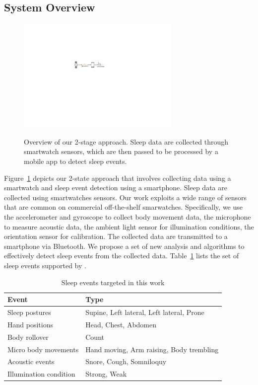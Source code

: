 \subsection{System Overview}

\begin{figure}
  \centering
  \includegraphics[width=0.7\textwidth]{figures/overviewd.pdf}\\
  \caption{Overview of our 2-stage approach. Sleep data are collected through smartwatch sensors, which are then passed to be processed by a mobile app
  to detect sleep events.}\label{fig:overview}
\end{figure}

Figure~\ref {fig:overview} depicts our 2-state approach that involves collecting data using a smartwatch and sleep event detection using a
smartphone. Sleep data are collected using smartwatches sensors. Our work exploits a wide range of sensors that are common on commercial
off-the-shelf smarwatches. Specifically, we use the accelerometer and gyroscope to collect body movement data, the microphone to measure
acoustic data, the ambient light sensor for illumination conditions, the orientation sensor for calibration. The collected data are
transmitted to a smartphone via Bluetooth. We propose a set of new analysis and algorithms to effectively detect sleep events from the
collected data. Table~\ref{tab:test} lists the set of sleep events supported by \systemname.

\begin{table}[t!]
 \caption{\label{tab:test}Sleep events targeted in this work}
 \centering
 \begin{tabular}{ll}
  \toprule
  \textbf{Event}& \textbf{Type} \\
  \midrule
\rowcolor{Gray}  Sleep postures & Supine, Left lateral, Left lateral, Prone\\
 Hand positions & Head, Chest, Abdomen\\
\rowcolor{Gray} Body rollover & Count\\
 Micro body movements& Hand moving, Arm raising, Body trembling \\
\rowcolor{Gray} Acoustic events & Snore, Cough, Somniloquy  \\
 Illumination condition & Strong, Weak  \\
  \bottomrule
 \end{tabular}
\end{table}

